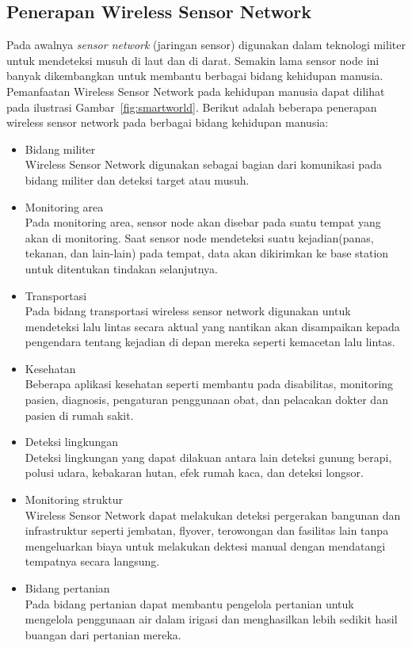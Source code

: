 \subsection{Penerapan Wireless Sensor Network}
Pada awalnya \textit{sensor network} (jaringan sensor) digunakan dalam teknologi militer untuk mendeteksi musuh di laut dan di darat. Semakin lama sensor node ini banyak dikembangkan untuk membantu berbagai bidang kehidupan manusia. Pemanfaatan Wireless Sensor Network pada kehidupan manusia dapat dilihat pada ilustrasi Gambar~\ref{fig:smartworld}. Berikut adalah beberapa penerapan wireless sensor network pada berbagai bidang kehidupan manusia:
\begin{itemize}
\item Bidang militer\\
Wireless Sensor Network digunakan sebagai bagian dari komunikasi pada bidang militer dan deteksi target atau musuh.

\item Monitoring area\\
Pada monitoring area, sensor node akan disebar pada suatu tempat yang akan di monitoring. Saat sensor node mendeteksi suatu kejadian(panas, tekanan, dan lain-lain) pada tempat, data akan dikirimkan ke base station untuk ditentukan tindakan selanjutnya.

\item Transportasi\\
Pada bidang transportasi wireless sensor network digunakan untuk mendeteksi lalu lintas secara aktual yang nantikan akan disampaikan kepada pengendara tentang kejadian di depan mereka seperti kemacetan lalu lintas. 

\item Kesehatan\\
Beberapa aplikasi kesehatan seperti membantu pada disabilitas, monitoring pasien, diagnosis, pengaturan penggunaan obat, dan pelacakan dokter dan pasien di rumah sakit.

\item Deteksi lingkungan\\
Deteksi lingkungan yang dapat dilakuan antara lain deteksi gunung berapi, polusi udara, kebakaran hutan, efek rumah kaca, dan deteksi longsor.

\item Monitoring struktur\\
Wireless Sensor Network dapat melakukan deteksi pergerakan bangunan dan infrastruktur seperti jembatan, flyover, terowongan dan fasilitas lain tanpa mengeluarkan biaya untuk melakukan dektesi manual dengan mendatangi tempatnya secara langsung.

\item Bidang pertanian\\
Pada bidang pertanian dapat membantu pengelola pertanian untuk mengelola penggunaan air dalam irigasi dan menghasilkan lebih sedikit hasil buangan dari pertanian mereka.
\end{itemize}

